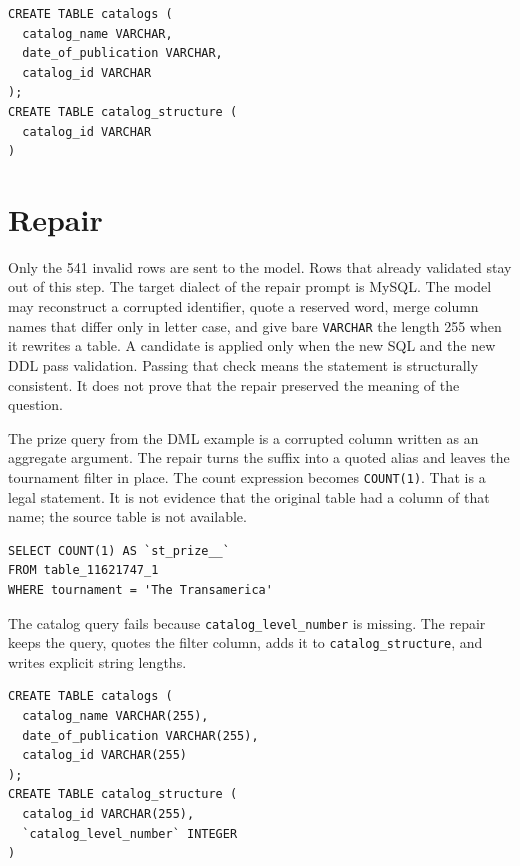 \documentclass[11pt,a4paper]{article}
\begin{document}
\begin{lstlisting}[caption={The DDL has no catalog\_level\_number column.}]
CREATE TABLE catalogs (
  catalog_name VARCHAR,
  date_of_publication VARCHAR,
  catalog_id VARCHAR
);
CREATE TABLE catalog_structure (
  catalog_id VARCHAR
)
\end{lstlisting}

\section{Repair}

Only the 541 invalid rows are sent to the model. Rows that already validated
stay out of this step. The target dialect of the repair prompt is MySQL. The
model may reconstruct a corrupted identifier, quote a reserved word, merge
column names that differ only in letter case, and give bare \texttt{VARCHAR}
the length 255 when it rewrites a table. A candidate is applied only when the
new SQL and the new DDL pass validation. Passing that check means the
statement is structurally consistent. It does not prove that the repair
preserved the meaning of the question.

The prize query from the DML example is a corrupted column written as an
aggregate argument. The repair turns the suffix into a quoted alias and leaves
the tournament filter in place. The count expression becomes \texttt{COUNT(1)}.
That is a legal statement. It is not evidence that the original table had a
column of that name; the source table is not available.

\begin{lstlisting}[caption={Repaired prize query. The alias is quoted, and the aggregate parses.}]
SELECT COUNT(1) AS `st_prize__`
FROM table_11621747_1
WHERE tournament = 'The Transamerica'
\end{lstlisting}

The catalog query fails because \texttt{catalog\_level\_number} is missing.
The repair keeps the query, quotes the filter column, adds it to
\texttt{catalog\_structure}, and writes explicit string lengths.

\begin{lstlisting}[caption={Repaired catalog DDL. The filter column is now defined.}]
CREATE TABLE catalogs (
  catalog_name VARCHAR(255),
  date_of_publication VARCHAR(255),
  catalog_id VARCHAR(255)
);
CREATE TABLE catalog_structure (
  catalog_id VARCHAR(255),
  `catalog_level_number` INTEGER
)
\end{lstlisting}
\end{document}

